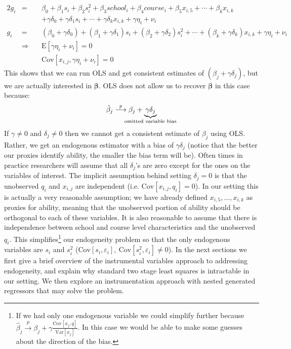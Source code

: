 \documentclass[12pt]{article}
\newcommand{\E}{\mathrm{E}}
\newcommand{\Cov}{\mathrm{Cov}}
\newcommand{\Var}{\mathrm{Var}}
\begin{document}
\begin{alignat*}{2}
g_i &= {}&&\beta_0 + \beta_1 s_i + \beta_2 s_i^2 + \beta_3 school_i + \beta_4 course_i + \beta_5 x_{i,5} + \cdots + \beta_k x_{i,k} \\
      &     &&+ \gamma \delta_0 + \gamma \delta_1 s_i + \cdots + \gamma \delta_k x_{i,k} + \gamma \eta_i + \nu_i \\
g_i &=   &&(\beta_0 + \gamma\delta_0) + (\beta_1 + \gamma\delta_1)s_i + (\beta_2 + \gamma\delta_2)s_i^2 + \cdots + (\beta_k + \gamma\delta_k)x_{i,k} + \gamma \eta_i + \nu_i \\
      &\Rightarrow \ &&{} \E[\gamma\eta_i + \nu_i] = 0 \\
      &                    &&{} \Cov[x_{i,j}, \gamma\eta_i + \nu_i] = 0
\end{alignat*}
This shows that we can run OLS and get consistent estimates of $(\beta_j + \gamma\delta_j)$, but we are actually interested in $\bm{\beta}$. OLS does not allow us to recover $\bm{\beta}$ in this case because:
$$
\hat{\beta}_j \stackrel{p}{\longrightarrow} \beta_j + \underbrace{\gamma\delta_j}_{ \mathclap{\text{omitted variable bias}} }
$$
If $\gamma \ne 0$ and $\delta_j \ne 0$ then we cannot get a consistent estimate of $\beta_j$ using OLS. Rather, we get an endogenous estimator with a bias of $\gamma\delta_j$ (notice that the better our proxies identify ability, the smaller the bias term will be). Often times in practice researchers will assume that all $\delta_j$'s are zero except for the ones on the variables of interest. The implicit assumption behind setting $\delta_j = 0$ is that the unobserved $q_i$ and $x_{i,j}$ are independent (i.e. $\Cov[x_{i,j}, q_i] = 0$). In our setting this is actually a very reasonable assumption; we have already defined $x_{i,5}, ..., x_{i,k}$ as proxies for ability, meaning that the unobserved portion of ability should be orthogonal to each of these variables. It  is also reasonable to assume that there is independence between school and course level characteristics and the unobserved $q_i$. This simplifies\footnote{If we had only one endogenous variable we could simplify further because $\hat{\beta}_j \stackrel{p}{\longrightarrow} \beta_j + \gamma\frac{\Cov[x_j, q]}{\Var[x_j]}$. In this case we would be able to make some guesses about the direction of the bias.} our endogeneity problem so that the only endogenous variables are $s_i$ and $s_i^2$ ($\Cov[s_i, \varepsilon_i], \ \Cov[s_i^2, \varepsilon_i] \ne 0$). In the next sections we first give a brief overview of the instrumental variables approach to addressing endogeneity, and explain why standard two stage least squares is intractable in our setting. We then explore an instrumentation approach with nested generated regressors that may solve the problem.
\end{document}
